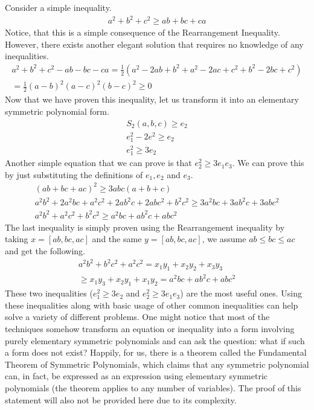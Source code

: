 \documentclass{article}
\begin{document}
Consider a simple inequality.
\begin{gather*}
	a^2 + b^2 + c^2 \geq ab + bc + ca
\end{gather*}
Notice, that this is a simple consequence of the Rearrangement Inequality. However, there exists another elegant solution that requires no knowledge of any inequalities.
\begin{multline*}
	a^2 + b^2 + c^2 - ab - bc - ca = \frac{1}{2}(a^2 - 2ab + b^2 + a^2 - 2ac + c^2 + b^2 - 2bc + c^2)
	\\ = \frac{1}{2}(a - b)^2 (a - c)^2 (b - c)^2 \geq 0
\end{multline*}
Now that we have proven this inequality, let us transform it into an elementary symmetric polynomial form.
\begin{gather*}
	S_2(a, b, c) \geq e_2 \\
	e_1^2 - 2e^2 \geq e_2 \\
	e_1^2 \geq 3 e_2
\end{gather*}
Another simple equation that we can prove is that \(e_2^2 \geq 3 e_1 e_3\). We can prove this by just substituting the definitions of \(e_1, e_2\) and \(e_3\).
\begin{gather*}
	(ab + bc + ac)^2 \geq 3abc(a + b + c) \\
	a^2 b^2 + 2 a^2 b c + a^2 c^2 + 2 a b^2 c + 2 a b c^2 + b^2 c^2 \geq 3a^2 bc + 3ab^2 c + 3ab c^2 \\
	a^2 b^2 + a^2 c^2 + b^2 c^2 \geq a^2 bc + a b^2 c + ab c^2
\end{gather*}
The last inequality is simply proven using the Rearrangement inequality by taking \(x =[ab, bc, ac]\) and the same \(y = [ab, bc, ac]\), we assume \(ab \leq bc \leq ac\) and get the following.
\begin{multline*}
	a^2 b^2 + b^2 c^2 + a^2 c^ 2 = x_1y_1 + x_2 y_2 + x_3 y_3 \\
	\geq x_1 y_3 + x_2 y_1 + x_1 y_2 = a^2 bc + a b^2 c + ab c^2
\end{multline*}
These two inequalities (\(e_1^2 \geq 3e_2\) and \(e_2^2 \geq 3 e_1 e_3\)) are the most useful ones. Using these inequalities along with basic usage of other common inequalities can help solve a variety of different problems. One might notice that most of the techniques somehow transform an equation or inequality into a form involving purely elementary symmetric polynomials and can ask the question: what if such a form does not exist? Happily, for us, there is a theorem called the Fundamental Theorem of Symmetric Polynomials, which claims that any symmetric polynomial can, in fact, be expressed as an expression using elementary symmetric polynomials (the theorem applies to any number of variables). The proof of this statement will also not be provided here due to its complexity.
\end{document}
